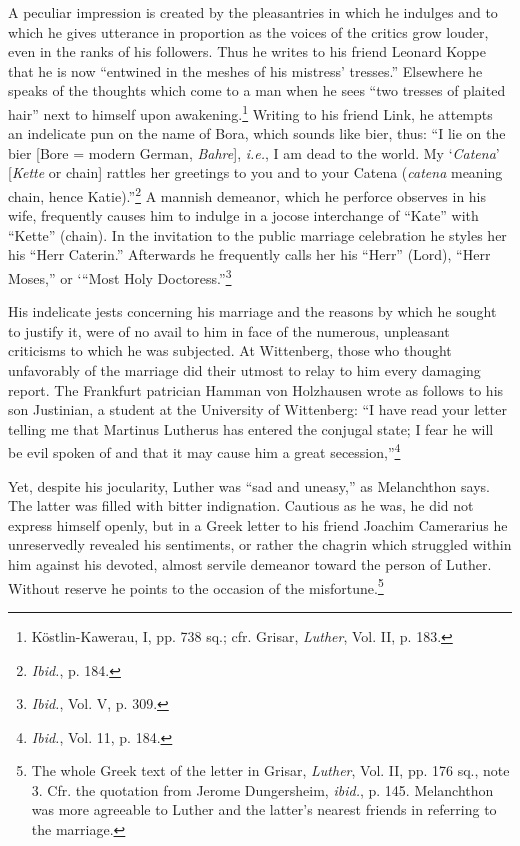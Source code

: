 A peculiar impression is created by the pleasantries in which he
indulges and to which he gives utterance in proportion as the voices
of the critics grow louder, even in the ranks of his followers. Thus
he writes to his friend Leonard Koppe that he is now “entwined in the
meshes of his mistress’ tresses.” Elsewhere he speaks of the thoughts
which come to a man when he sees “two tresses of plaited hair” next
to himself upon awakening.\footnote
{Köstlin-Kawerau, I, pp. 738 sq.; cfr. Grisar, \textit{Luther}, Vol. II, p. 183.}
Writing to his friend Link, he attempts an
indelicate pun on the name of Bora, which sounds like
bier, thus: “I lie on the bier [Bore = modern German, \textit{Bahre}], \textit{i.e.},
I am dead to the world. My ‘\textit{Catena}’ [\textit{Kette} or chain] rattles her
greetings to you and to your Catena (\textit{catena} meaning chain, hence
Katie).”\footnote{\textit{Ibid.}, p. 184.}
A mannish demeanor, which he perforce observes in his
wife, frequently causes him to indulge in a jocose interchange of
“Kate” with “Kette” (chain). In the invitation to the public marriage
celebration he styles her his “Herr Caterin.” Afterwards he
frequently calls her his “Herr” (Lord), “Herr Moses,” or ‘“Most
Holy Doctoress.”\footnote{\textit{Ibid.}, Vol. V, p. 309.}

His indelicate jests concerning his marriage and the reasons by
which he sought to justify it, were of no avail to him in face of
the numerous, unpleasant criticisms to which he was subjected. At
Wittenberg, those who thought unfavorably of the marriage did
their utmost to relay to him every damaging report. The Frankfurt
patrician Hamman von Holzhausen wrote as follows to his son Justinian,
a student at the University of Wittenberg: “I have read your
letter telling me that Martinus Lutherus has entered the conjugal
state; I fear he will be evil spoken of and that it may cause him a great
secession,”\footnote{\textit{Ibid.}, Vol. 11, p. 184.}

Yet, despite his jocularity, Luther was “sad and uneasy,” as Melanchthon
says. The latter was filled with bitter indignation. Cautious as he was,
he did not express himself openly, but in a Greek
letter to his friend Joachim Camerarius he unreservedly revealed his
sentiments, or rather the chagrin which struggled within him against
his devoted, almost servile demeanor toward the person of Luther.
Without reserve he points to the occasion of the misfortune.\footnote
{The whole Greek text of the letter in Grisar, \textit{Luther}, Vol. II, pp. 176 sq., note 3.
Cfr. the quotation from Jerome Dungersheim, \textit{ibid.}, p. 145. Melanchthon was more
agreeable to Luther and the latter’s nearest friends in referring to the marriage.}

